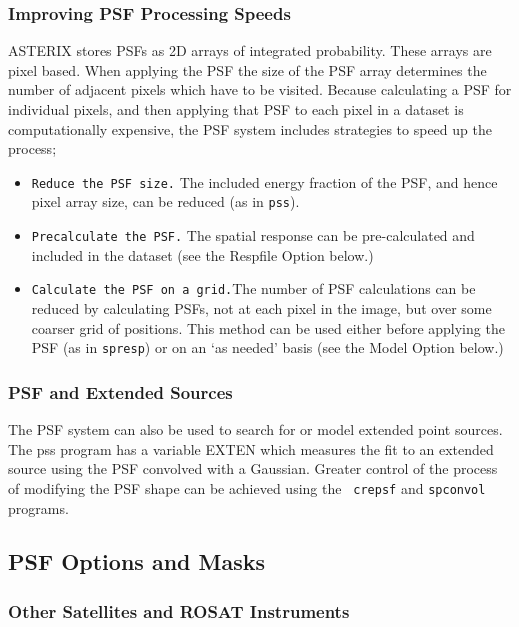\documentclass[11pt,fleqn]{article}    %
\begin{document}
\subsubsection{Improving PSF Processing Speeds}

ASTERIX stores  PSFs as 2D arrays of  integrated probability. These arrays
are  pixel  based.   When  applying  the PSF  the  size of  the  PSF  array
determines the number of adjacent pixels which have to be visited.  Because
calculating a PSF  for individual pixels,  and then applying  that PSF to each
pixel  in a dataset is  computationally expensive, the PSF system includes
strategies to speed up the process;

\begin{itemize}
\item {{\tt Reduce  the PSF size.} The included energy   fraction of the PSF,
    and hence pixel array size, can be reduced (as in {\tt pss}).}
\item {{\tt Precalculate the PSF.} The spatial response can be pre-calculated
    and included in the dataset (see the Respfile Option below.)}
\item {{\tt Calculate the PSF on a grid.}The number of PSF calculations can
    be reduced by calculating PSFs,  not at each pixel  in the image, but over
    some coarser  grid of positions. This  method can be used either before
    applying the PSF (as in {\tt  spresp}) or on  an `as needed' basis (see
    the Model Option below.)}
\end{itemize}

\subsubsection{PSF and Extended Sources} 

The PSF  system can  also  be used to  search  for or model  extended point
sources.  The pss program has a variable EXTEN which measures the fit to an
extended source using the PSF convolved with a Gaussian. Greater control of
the   process of modifying the  PSF  shape can be   achieved using the {\tt
  crepsf} and {\tt spconvol} programs.

\subsection{PSF Options and Masks}
\subsubsection{Other Satellites and ROSAT Instruments}
\end{document}
